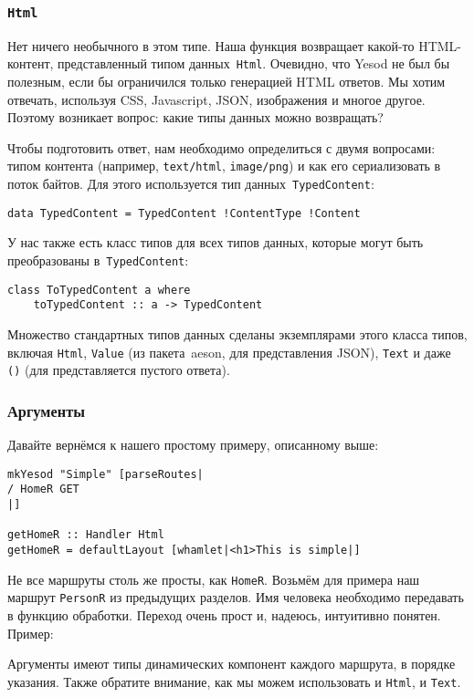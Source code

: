 \subsubsection{\lstinline'Html'}
Нет ничего необычного в этом типе. Наша функция возвращает какой-то HTML-контент,
представленный типом данных~\lstinline'Html'. Очевидно, что Yesod не был бы полезным,
если бы ограничился только генерацией HTML ответов. Мы хотим отвечать, используя
CSS, Javascript, JSON, изображения и многое другое. Поэтому возникает вопрос: какие
типы данных можно возвращать?

Чтобы подготовить ответ, нам необходимо определиться с двумя вопросами:
типом контента (например, \texttt{text/html}, \texttt{image/png}) и как его
сериализовать в поток байтов. Для этого используется тип данных~\lstinline'TypedContent':
\begin{lstlisting}
data TypedContent = TypedContent !ContentType !Content
\end{lstlisting}

У нас также есть класс типов для всех типов данных, которые могут быть преобразованы
в~\lstinline'TypedContent':
\begin{lstlisting}
class ToTypedContent a where
    toTypedContent :: a -> TypedContent
\end{lstlisting}

Множество стандартных типов данных сделаны экземплярами этого класса типов, включая
\lstinline'Html', \lstinline'Value' (из пакета~aeson, для представления JSON),
\lstinline'Text' и даже \lstinline'()' (для представляется пустого ответа).

\subsubsection{Аргументы}
Давайте вернёмся к нашего простому примеру, описанному выше:
\begin{lstlisting}
mkYesod "Simple" [parseRoutes|
/ HomeR GET
|]

getHomeR :: Handler Html
getHomeR = defaultLayout [whamlet|<h1>This is simple|]
\end{lstlisting}

Не все маршруты столь же просты, как \lstinline!HomeR!.
Возьмём для примера наш маршрут
\lstinline!PersonR! из предыдущих разделов. Имя человека необходимо
передавать в функцию обработки. Переход очень прост и, надеюсь,
интуитивно понятен. Пример:

Аргументы имеют типы динамических компонент каждого маршрута, в порядке
указания. Также обратите внимание, как мы можем использовать и
\lstinline!Html!, и \lstinline!Text!.

